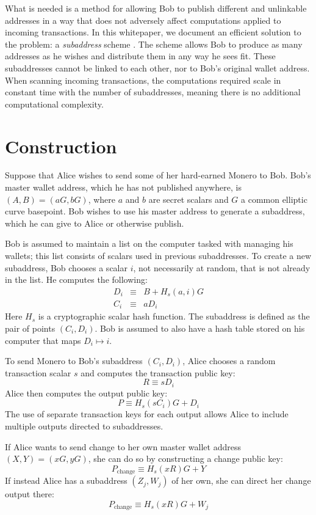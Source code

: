 \documentclass{mrl}
\begin{document}
What is needed is a method for allowing Bob to publish different and unlinkable addresses in a way that does not adversely affect computations applied to incoming transactions. In this whitepaper, we document an efficient solution to the problem: a \textit{subaddress} scheme \cite{pr}. The scheme allows Bob to produce as many addresses as he wishes and distribute them in any way he sees fit. These subaddresses cannot be linked to each other, nor to Bob's original wallet address. When scanning incoming transactions, the computations required scale in constant time with the number of subaddresses, meaning there is no additional computational complexity.


\section{Construction}
Suppose that Alice wishes to send some of her hard-earned Monero to Bob. Bob's master wallet address, which he has not published anywhere, is $(A,B) = (aG, bG)$, where $a$ and $b$ are secret scalars and $G$ a common elliptic curve basepoint. Bob wishes to use his master address to generate a subaddress, which he can give to Alice or otherwise publish.

Bob is assumed to maintain a list on the computer tasked with managing his wallets; this list consists of scalars used in previous subaddresses. To create a new subaddress, Bob chooses a scalar $i$, not necessarily at random, that is not already in the list. He computes the following:
\begin{eqnarray*}
D_i &\equiv& B + H_s(a,i)G \\
C_i &\equiv& aD_i
\end{eqnarray*}
Here $H_s$ is a cryptographic scalar hash function. The subaddress is defined as the pair of points $(C_i,D_i)$. Bob is assumed to also have a hash table stored on his computer that maps $D_i \mapsto i$.

To send Monero to Bob's subaddress $(C_i,D_i)$, Alice chooses a random transaction scalar $s$ and computes the transaction public key:
$$R \equiv sD_i$$
Alice then computes the output public key:
$$P \equiv H_s(sC_i)G + D_i$$
The use of separate transaction keys for each output allows Alice to include multiple outputs directed to subaddresses.

If Alice wants to send change to her own master wallet address $(X,Y) = (xG,yG)$, she can do so by constructing a change public key:
$$P_{\operatorname{change}} \equiv H_s(xR)G + Y$$
If instead Alice has a subaddress $(Z_j,W_j)$ of her own, she can direct her change output there:
$$P_{\operatorname{change}} \equiv H_s(xR)G + W_j$$
\end{document}
